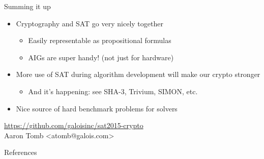 \documentclass[ignorenonframetext,]{beamer}
\providecommand{\tightlist}{%
  \setlength{\itemsep}{0pt}\setlength{\parskip}{0pt}}
\newcommand{\aurl}[1]{\alert{\url{#1}}}
\begin{document}
\begin{frame}{Summing it up}

\begin{itemize}
\tightlist
\item
  Cryptography and SAT go very nicely together

  \begin{itemize}
  \tightlist
  \item
    Easily representable as propositional formulas
  \item
    AIGs are super handy! (not just for hardware)
  \end{itemize}
\item
  More use of SAT during algorithm development will make our crypto
  stronger

  \begin{itemize}
  \tightlist
  \item
    And it's happening: see SHA-3, Trivium, SIMON, etc.
  \end{itemize}
\item
  Nice source of hard benchmark problems for solvers
\end{itemize}

\begin{center}
\aurl{https://github.com/galoisinc/sat2015-crypto}\\
Aaron Tomb <atomb@galois.com>
\end{center}

\end{frame}

\begin{frame}[allowframebreaks]{References}
  
  
\end{frame}
\end{document}
